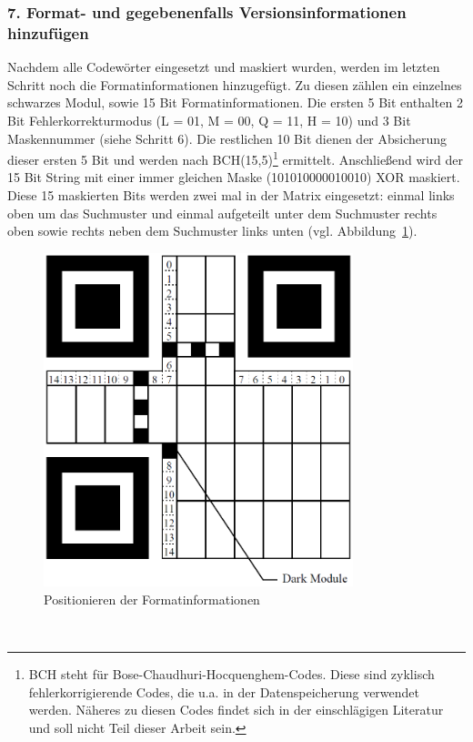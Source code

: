 \subsubsection*{7. Format- und gegebenenfalls Versionsinformationen hinzufügen}
Nachdem alle Codewörter eingesetzt und maskiert wurden, werden im letzten Schritt noch die Formatinformationen hinzugefügt. Zu diesen zählen ein einzelnes schwarzes Modul, sowie 15 Bit Formatinformationen. Die ersten 5 Bit enthalten 2 Bit Fehlerkorrekturmodus (L = 01, M = 00, Q = 11, H = 10) und 3 Bit Maskennummer (siehe Schritt 6). Die restlichen 10 Bit dienen der Absicherung dieser ersten 5 Bit und werden nach BCH(15,5)\footnote{BCH steht für Bose-Chaudhuri-Hocquenghem-Codes. Diese sind zyklisch fehlerkorrigierende Codes, die u.a. in der Datenspeicherung verwendet werden. Näheres zu diesen Codes findet sich in der einschlägigen Literatur und soll nicht Teil dieser Arbeit sein.} ermittelt. Anschließend wird der 15 Bit String mit einer immer gleichen Maske (101010000010010) XOR maskiert.
Diese 15 maskierten Bits werden zwei mal in der Matrix eingesetzt: einmal links oben um das Suchmuster und einmal aufgeteilt unter dem Suchmuster rechts oben sowie rechts neben dem Suchmuster links unten (vgl. Abbildung~\ref{fig:formatinformationpositioning}).\\
\begin{figure}[htbp]
	\centering
	\includegraphics[width=9cm]{Bilder/QR_Format_Positioning.png}
	\caption[Positionieren der Formatinformationen]{Positionieren der Formatinformationen\footnotemark}
	\label{fig:formatinformationpositioning}
	\hfill
\end{figure}
~\\

